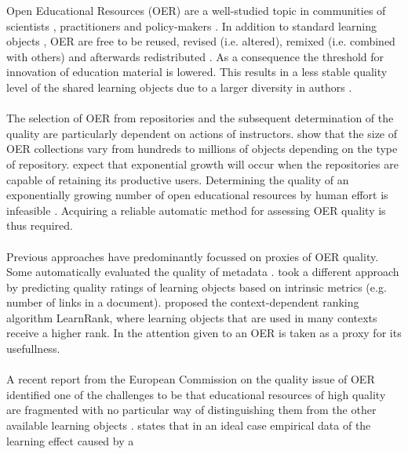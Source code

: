 Open Educational Resources (OER) are a well-studied topic in communities of
scientists \citep{Wiley2014, Hylen2012, Duval2010}, practitioners
\citep{Johnson2013, Yuan2013, Trendsurfoe2014} and policy-makers
\citep{Bussemaker2014,OECD2007}. In addition to standard learning objects
\citep{McGreal2004}, OER are free to be reused, revised (i.e. altered), remixed
(i.e. combined with others) and afterwards redistributed \citep{Hilton2010}. As
a consequence the threshold for innovation of education material is lowered.
This results in a less stable quality level of the shared learning objects due
to a larger diversity in authors \citep{Weller2010}.\\\\
\noindent
The selection of OER from repositories and the subsequent determination of the
quality are particularly dependent on actions of instructors. \citet{Ochoa2009}
show that the size of OER collections vary from hundreds to
millions of objects depending on the type of repository. \citeauthor{Ochoa2009}
expect that exponential growth will occur when the repositories are capable of
retaining its productive users. Determining the quality of an exponentially
growing number of open educational resources by human effort is infeasible
\citep{Cechinel2011, Ochoa2006, Zemsky2004}. Acquiring a reliable automatic
method for assessing OER quality is thus required.\\\\
\noindent
Previous approaches have predominantly focussed on proxies of OER quality. Some
automatically evaluated the quality of metadata \citep{Ochoa2009, Tani2013}.
\citet{Cechinel2011, Cechinel2012} took a different approach by predicting quality ratings of
learning objects based on intrinsic metrics (e.g. number of links in a
document). \citet{Duval2006} proposed the context-dependent ranking algorithm
LearnRank, where learning objects that are used in many contexts receive a
higher rank. In \citep{Ochoa2006} the attention given to an OER is taken as a
proxy for its usefullness.\\\\
\noindent
A recent report from the European Commission on the quality issue of OER
identified one of the challenges to be that educational resources of high
quality are fragmented with no particular way of distinguishing them from the
other available learning objects \citep{Camilleri2014}. \citet{Duval2006}
states that in an ideal case empirical data of the learning effect caused by a
